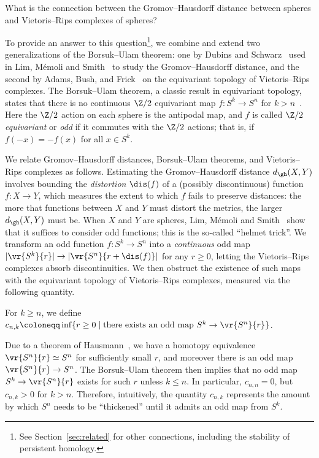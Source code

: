 \documentclass[11pt, reqno, english]{amsart}
\begin{document}
\begin{question-motivating}
What is the connection between the Gromov--Hausdorff distance between spheres and Vietoris--Rips complexes of spheres?
\end{question-motivating}

To provide an answer to this question\footnote{See Section~\ref{sec:related} for other connections, including the stability of persistent homology.}, we combine and extend two generalizations of the Borsuk--Ulam theorem: one by Dubins and Schwarz~\cite{dubins1981equidiscontinuity} used in Lim, M\'{e}moli and Smith~\cite{lim2021gromov} to study the Gromov--Hausdorff distance, and the second by Adams, Bush, and Frick~\cite{ABF,ABF2} on the equivariant topology of Vietoris--Rips complexes.
The Borsuk--Ulam theorem, a classic result in equivariant topology, states that there is no continuous $\Z/2$ equivariant map $f \colon S^k \to S^n$ for $k > n$~\cite{matousek2003using}.
Here the $\Z/2$ action on each sphere is the antipodal map, and $f$ is called \emph{$\Z/2$ equivariant} or \emph{odd} if it commutes with the $\Z/2$ actions; that is, if $f(-x) = -f(x)$ for all $x \in S^k$.

We relate Gromov--Hausdorff distances, Borsuk--Ulam theorems, and Vietoris--Rips complexes as follows.
Estimating the Gromov--Hausdorff distance $d_{\gh}(X,Y)$ involves bounding the \emph{distortion} $\dis(f)$ of a (possibly discontinuous) function $f:X\to Y$, which measures the extent to which $f$ fails to preserve distances: the more that functions between $X$ and $Y$ must distort the metrics, the larger $d_{\gh}(X,Y)$ must be.
When $X$ and $Y$ are spheres, Lim, M\'{e}moli and Smith~\cite{lim2021gromov} show that it suffices to consider odd functions; this is the so-called ``helmet trick''.
We transform an odd function $f\colon S^k \to S^n$ into a \emph{continuous} odd map $|\vr{S^k}{r}| \to |\vr{S^n}{r+\dis(f)}|$ for any $r \geq 0$, letting the Vietoris--Rips complexes absorb discontinuities.
We then obstruct the existence of such maps with the equivariant topology of Vietoris--Rips complexes, measured via the following quantity.

\begin{definition}
\label{def:cnk}
For $k\ge n$, we define $c_{n,k} \coloneqq \inf\{r\ge 0 \mid \text{there exists an odd map }S^k \to \vr{S^n}{r}\}$.
\end{definition}

Due to a theorem of Hausmann~\cite{Hausmann1995}, we have a homotopy equivalence $\vr{S^n}{r} \simeq S^n$ for sufficiently small $r$, and moreover there is an odd map $\vr{S^n}{r} \to S^n$.
The Borsuk--Ulam theorem then implies that no odd map $S^k \to \vr{S^n}{r}$ exists for such $r$ unless $k \le n$.
In particular, $c_{n,n}=0$, but $c_{n,k} > 0$ for $k > n$.
Therefore, intuitively, the quantity $c_{n,k}$ represents the amount by which $S^n$ needs to be ``thickened'' until it admits an odd map from $S^k$.
\end{document}
